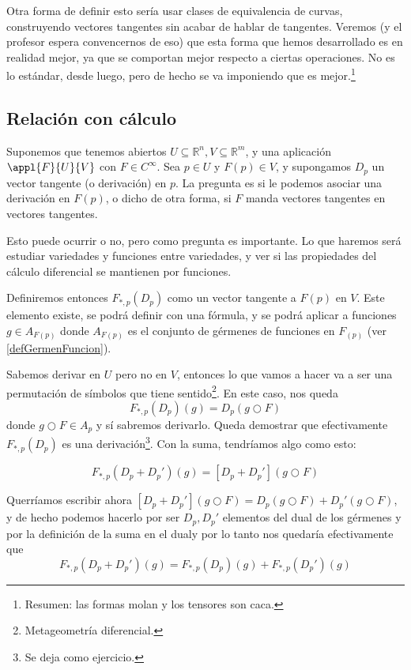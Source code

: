 Otra forma de definir esto sería usar clases de equivalencia de curvas, construyendo vectores tangentes sin acabar de hablar de tangentes. Veremos (y el profesor espera convencernos de eso) que esta forma que hemos desarrollado es en realidad mejor, ya que se comportan mejor respecto a ciertas operaciones. No es lo estándar, desde luego, pero de hecho se va imponiendo que es mejor.\footnote{Resumen: las formas molan y los tensores son caca.}

\subsection{Relación con cálculo}

Suponemos que tenemos abiertos $U⊆ℝ^n, V⊆ℝ^m$, y una aplicación $\appl{F}{U}{V}$ con $F ∈ C^∞$. Sea $p ∈U$ y $F(p) ∈V$, y supongamos $D_p$ un vector tangente (o derivación) en $p$. La pregunta es si le podemos asociar una derivación en $F(p)$, o dicho de otra forma, si $F$ manda vectores tangentes en vectores tangentes.

Esto puede ocurrir o no, pero como pregunta es importante. Lo que haremos será estudiar variedades y funciones entre variedades, y ver si las propiedades del cálculo diferencial se mantienen por funciones.

Definiremos entonces $F_{*,p}(D_p)$ como un vector tangente a $F(p)$ en $V$. Este elemento existe, se podrá definir con una fórmula, y se podrá aplicar a funciones $g ∈ A_{F(p)}$ donde $A_{F(p)}$ es el conjunto de gérmenes de funciones en $F_{(p)}$ (ver \ref{defGermenFuncion}).

Sabemos derivar en $U$ pero no en $V$, entonces lo que vamos a hacer va a ser una permutación de símbolos que tiene sentido\footnote{Metageometría diferencial.}. En este caso, nos queda \[ F_{*,p}(D_p)(g) = D_p (g ○ F)\] donde $g ○ F ∈ A_p$ y sí sabremos derivarlo. Queda demostrar que efectivamente $F_{*,p}(D_p)$ es una derivación\footnote{Se deja como ejercicio.}. Con la suma, tendríamos algo como esto:

\[ F_{*,p}(D_p + D_p')(g) = [D_p + D_p'](g○F) \]

Querríamos escribir ahora  $[D_p + D_p'](g○F) = D_p (g○F) + D_p'(g○F)$, y de hecho podemos hacerlo por ser $D_p, D_p'$ elementos del dual de los gérmenes y por la definición de la suma en el dual\footnotemark y por lo tanto nos quedaría efectivamente que \[ F_{*,p}(D_p + D_p')(g) = F_{*,p}(D_p)(g) + F_{*,p}(D_p')(g) \]


